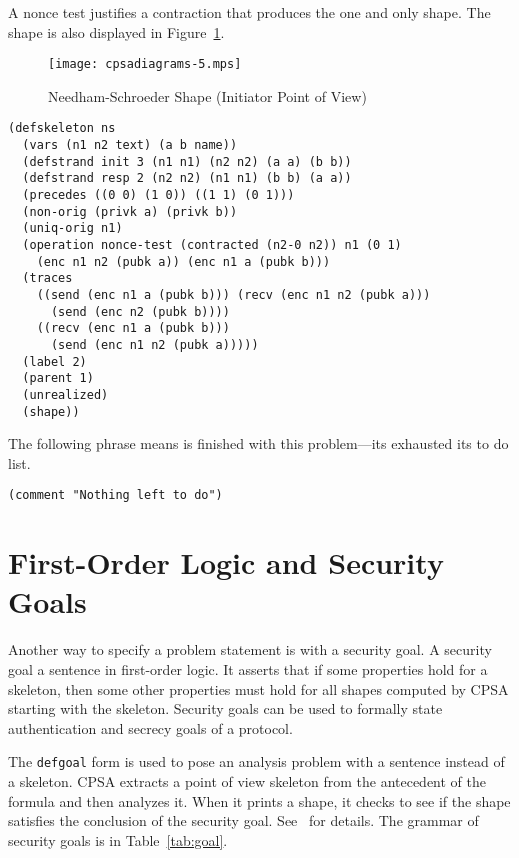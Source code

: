\documentclass[12pt]{article}
\begin{document}
A nonce test justifies a contraction that produces the one and only
shape.  The shape is also displayed in Figure~\ref{fig:ns init pov}.

\begin{figure}
\begin{center}
\texttt{[image: cpsadiagrams-5.mps]}
\caption{Needham-Schroeder Shape (Initiator Point of View)}
\label{fig:ns init pov}
\end{center}
\end{figure}

\begin{verbatim}
(defskeleton ns
  (vars (n1 n2 text) (a b name))
  (defstrand init 3 (n1 n1) (n2 n2) (a a) (b b))
  (defstrand resp 2 (n2 n2) (n1 n1) (b b) (a a))
  (precedes ((0 0) (1 0)) ((1 1) (0 1)))
  (non-orig (privk a) (privk b))
  (uniq-orig n1)
  (operation nonce-test (contracted (n2-0 n2)) n1 (0 1)
    (enc n1 n2 (pubk a)) (enc n1 a (pubk b)))
  (traces
    ((send (enc n1 a (pubk b))) (recv (enc n1 n2 (pubk a)))
      (send (enc n2 (pubk b))))
    ((recv (enc n1 a (pubk b)))
      (send (enc n1 n2 (pubk a)))))
  (label 2)
  (parent 1)
  (unrealized)
  (shape))
\end{verbatim}

The following phrase means {\cpsa} is finished with this problem---its
exhausted its to do list.

\begin{verbatim}
(comment "Nothing left to do")
\end{verbatim}

\section{First-Order Logic and Security Goals}\label{sec:security goals}

Another way to specify a problem statement is with a security goal. A
security goal a sentence in first-order logic.  It asserts that if
some properties hold for a skeleton, then some other properties must
hold for all shapes computed by CPSA starting with the skeleton.
Security goals can be used to formally state authentication and
secrecy goals of a protocol.

The \texttt{defgoal} form is used to pose an analysis problem with a
sentence instead of a skeleton.  CPSA extracts a point of view
skeleton from the antecedent of the formula and then analyzes it.
When it prints a shape, it checks to see if the shape satisfies the
conclusion of the security goal.  See~\cite{cpsagoals09} for details.
The grammar of security goals is in Table~\ref{tab:goal}.
\end{document}
